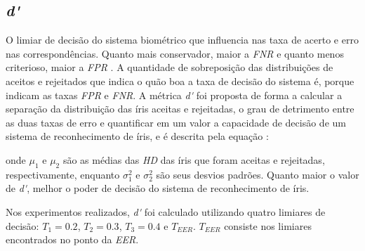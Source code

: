 \FloatBarrier

\subsection{\textit{\acrfull{d'}}}\label{sec:experimentos:daugman}

\par O limiar de decisão do sistema biométrico que influencia nas taxa de acerto e erro nas correspondências. Quanto mais conservador, maior a \textit{\acrshort{FNR}} e quanto menos criterioso, maior a \textit{\acrshort{FPR}} \cite{daugman2000}. A quantidade de sobreposição das distribuições de aceitos e rejeitados que indica o quão boa a taxa de decisão do sistema é, porque indicam as taxas \textit{\acrshort{FPR}} e \textit{\acrshort{FNR}}. A métrica \textit{\acrshort{d'}} foi proposta de forma a calcular a separação da distribuição das íris aceitas e rejeitadas, o grau de detrimento entre as duas taxas de erro e quantificar em um valor a capacidade de decisão de um sistema de reconhecimento de íris, e é descrita pela equação \cite{daugman2000}:


\noindent onde $\mu_{1}$ e $\mu_{2}$ são as médias das \textit{\acrshort{HD}} das íris que foram aceitas e rejeitadas, respectivamente, enquanto $\sigma_{1}^2$ e $\sigma_{2}^2$ são seus desvios padrões. Quanto maior o valor de \textit{\acrshort{d'}}, melhor o poder de decisão do sistema de reconhecimento de íris.

\par Nos experimentos realizados, \textit{\acrshort{d'}} foi calculado utilizando quatro limiares de decisão: $T_{1} = 0.2$, $T_{2} = 0.3$, $T_{3} = 0.4$ e $T_{EER}$. $T_{EER}$ consiste nos limiares encontrados no ponto da \textit{\acrshort{EER}}.



